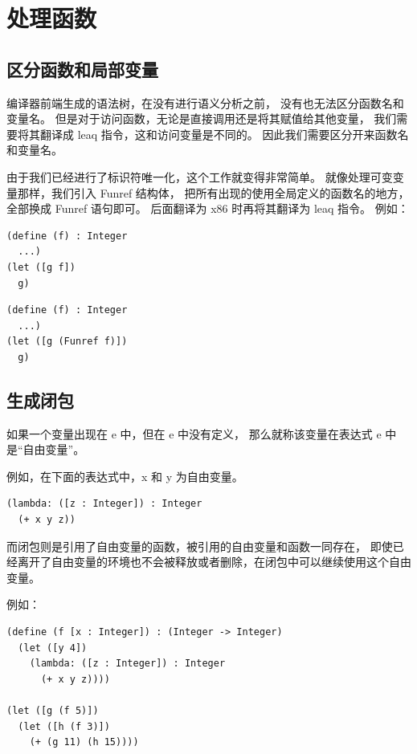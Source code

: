 
\section{处理函数}

\subsection{区分函数和局部变量}

编译器前端生成的语法树，在没有进行语义分析之前，
没有也无法区分函数名和变量名。
但是对于访问函数，无论是直接调用还是将其赋值给其他变量，
我们需要将其翻译成 leaq 指令，这和访问变量是不同的。
因此我们需要区分开来函数名和变量名。

由于我们已经进行了标识符唯一化，这个工作就变得非常简单。
就像处理可变变量那样，我们引入 Funref 结构体，
把所有出现的使用全局定义的函数名的地方，全部换成 Funref 语句即可。
后面翻译为 x86 时再将其翻译为 leaq 指令。
例如：

\begin{transformation}
\begin{lstlisting}
(define (f) : Integer
  ...)
(let ([g f])
  g)
\end{lstlisting}
\compilesto
\begin{lstlisting}
(define (f) : Integer
  ...)
(let ([g (Funref f)])
  g)
\end{lstlisting}
\end{transformation}

\subsection{生成闭包}

如果一个变量出现在 e 中，但在 e 中没有定义，
那么就称该变量在表达式 e 中是“自由变量”。

例如，在下面的表达式中，x 和 y 为自由变量。
\begin{lstlisting}
(lambda: ([z : Integer]) : Integer
  (+ x y z))
\end{lstlisting}

而闭包则是引用了自由变量的函数，被引用的自由变量和函数一同存在，
即使已经离开了自由变量的环境也不会被释放或者删除，在闭包中可以继续使用这个自由变量。

例如：
\begin{lstlisting}
(define (f [x : Integer]) : (Integer -> Integer)
  (let ([y 4])
    (lambda: ([z : Integer]) : Integer
      (+ x y z))))

(let ([g (f 5)])
  (let ([h (f 3)])
    (+ (g 11) (h 15))))
\end{lstlisting}

